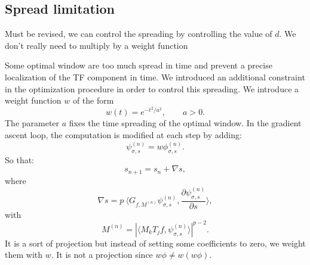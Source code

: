 \documentclass[11pt]{article}
\begin{document}
\subsection{Spread limitation}
 {\color{red} Must be revised, we can control the spreading by controlling the value of $d$. We don't really need to multiply by a weight function}

Some optimal window are too much spread in time and prevent a precise localization of the TF component in time. We introduced an additional constraint in the optimization procedure in order to control this spreading. We introduce a weight function $w$ of the form
$$w(t)=e^{-t^2/a^2}, \qquad a>0.
$$
The parameter $a$ fixes the time spreading of the optimal window.
In the gradient ascent loop, the computation is  modified at each step by adding:
$$\psi_{\sigma,s}^{(n)}=w \phi_{\sigma,s}^{(n)}.
$$
So that:
$$s_{n+1}=s_n+\nabla s,
$$
where
$$\nabla s=p\ \langle G_{f,M^{(n)}}\psi_{\sigma,s}^{(n)},\frac{\partial \psi_{\sigma,s}^{(n)}}{\partial s}\rangle,
$$
with 
$$M^{(n)}=|\langle M_kT_jf ,\psi_{\sigma,s}^{(n)}\rangle |^{p-2}.
$$
It is a sort of projection but instead of setting some coefficients to zero, we weight them with $w$. {\color{red} It is not a projection since $w\phi\neq w(w\phi)$}.





 
\end{document}
